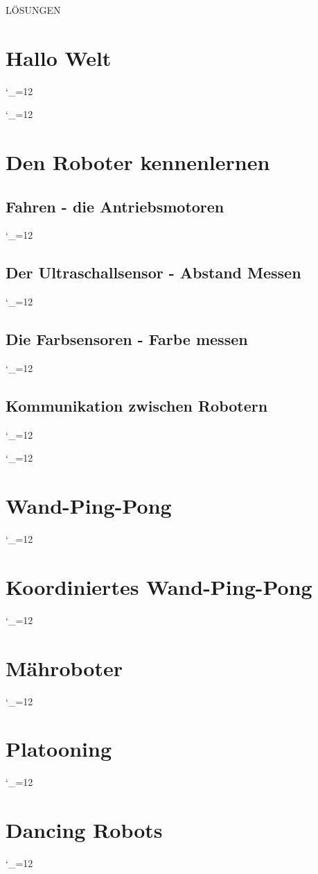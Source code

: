 \documentclass[
	12pt,
	article,
	type=bsc, %
	colorbacktitle,
	instlogo,
	accentcolor=tud1c,
	draft,
	german,
	solution,
	twoside
]{tudexercise}
\newcommand{\solpath}[0]{../../impl/androidApp/app/src/main/java/org/mindroid/android/app/programs/workshop/solutions}
\newcommand{\sol}{\begingroup
  \catcode`_=12 \docodelst}
\newcommand{\docodelst}[1]{
  	
  \endgroup
}
\begin{document}
	
	
	\centering	
	\bigskip\bigskip\bigskip\bigskip\bigskip\bigskip\bigskip\bigskip\bigskip	
	{\Huge LÖSUNGEN}
	
	\newpage
	\section{Hallo Welt}
	\sol{HelloWorld}
	\sol{HelloDate}
	
	\newpage
	\section{Den Roboter kennenlernen}	
		\subsection{Fahren - die Antriebsmotoren}	
			\sol{DriveSquare}
		
		\newpage	
		\subsection{Der Ultraschallsensor - Abstand Messen}	
			\sol{ParkingSensor}	
		
		\newpage	
		\subsection{Die Farbsensoren - Farbe messen}
			\sol{ColorTest}
		
		\newpage	
		\subsection{Kommunikation zwischen Robotern}
			\sol{HelloWorldPingB}
			\sol{HelloWorldPingR}
	
	\newpage
	\section{Wand-Ping-Pong}
		\sol{ImpSingleWallPingPong}
	
	\newpage	
	\section{Koordiniertes Wand-Ping-Pong}
		\sol{ImpCoordWallPingPong}
		
	\newpage	
	\section{Mähroboter}
		\sol{LawnMower}
	
	\newpage
	\section{Platooning}
		\sol{Platooning}

	\section{Dancing Robots}
		\sol{Follow}
	
\end{document}
